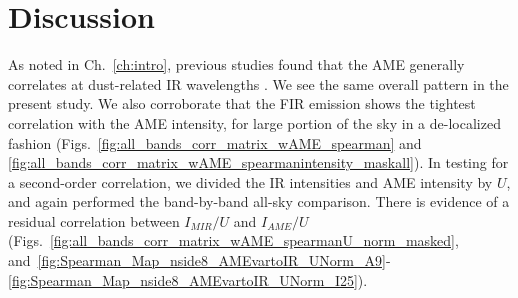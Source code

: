 
    \section{Discussion}
        As noted in Ch.~\ref{ch:intro}, previous studies found that the AME generally correlates at dust-related IR wavelengths \citep{ysard10b,planckXV, hensley16}. We see the same overall pattern in the present study. We also corroborate that the FIR emission shows the tightest correlation with the AME intensity, for large portion of the sky in a de-localized fashion (Figs.~\ref{fig:all_bands_corr_matrix_wAME_spearman} and~ \ref{fig:all_bands_corr_matrix_wAME_spearmanintensity_maskall}). In testing for a second-order correlation, we divided the IR intensities and AME intensity by $U$, and again performed the band-by-band all-sky comparison. There is evidence of a residual correlation between $I_{MIR}/U$ and $I_{AME}/U$ (Figs.~\ref{fig:all_bands_corr_matrix_wAME_spearmanU_norm_masked}, and~\ref{fig:Spearman_Map_nside8_AMEvartoIR_UNorm_A9}-\ref{fig:Spearman_Map_nside8_AMEvartoIR_UNorm_I25}).


